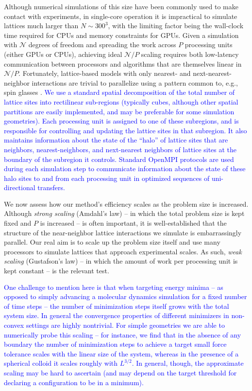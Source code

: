 \documentclass[utf8]{frontiersFPHY} %
\newcommand{\DMS}[1]{\textcolor{blue}{#1}}
\begin{document}
Although numerical simulations of this size have been commonly used to make contact with experiments, in single-core operation it is impractical to simulate lattices much larger than $N \sim 300^3$, with the limiting factor being the wall-clock time required for CPUs and memory constraints for GPUs. Given a simulation with $\mathcal{N}$ degrees of freedom and spreading the work across $P$ processing units (either GPUs or CPUs), achieving ideal $\mathcal{N}/P$ scaling requires both low-latency communication between processors and algorithms that are themselves linear in $\mathcal{N}/P$. Fortunately, lattice-based models with only nearest- and next-nearest-neighbor interactions are trivial to parallelize using a pattern common to, e.g., spin glasses \citep{lulli2015highly}. \DMS{We use a standard spatial decomposition of the total number of lattice sites into rectilinear sub-regions (typically cubes, although other spatial partitions are easily implemented, and may be preferable for some simulation geometries). Each processing unit is assigned to one of these subregions, and is responsible for controlling and updating the lattice sites in that subregion. It also maintains information about the state of the ``halo'' of lattice sites that are neighbors, nearest-neighbors, and next-nearest neighbors of lattice sites at the boundary of the subregion it controls. Standard OpenMPI protocols \citep{gabriel2004open} are used during each simulation step to communicate information about the state of these halo sites to and from each processing unit in optimized sequences of uni-directional transfers.}

We now assess how our method's efficiency scales as the problem size is increased. Although \emph{strong scaling} (Amdahl's law) -- in which the total problem size is kept fixed and $P$ is increased -- is often important, it is well-established that the structure of the near-neighbor lattice interactions we simulate is embarrassingly parallel. Our real aim is to scale up the problem size itself and use many processors to simulate lattices that approach experimental scales. As such, \emph{weak scaling} (Gustafson's law) -- in which the amount of work per processing unit is kept constant -- is the relevant test. 

\DMS{One challenge to mention here is that when targeting energy minima -- as opposed to simply advancing a molecular dynamics simulation for a fixed number of time steps -- the number of minimization steps itself grows with the total system size. In general the convergence properties of different minimizers in non-convex settings are highly nontrivial. For simple geometries we are able to numerically probe this scaling  -- for instance, we find that in the absence of any boundary the number of minimization steps to achieve a target small force tolerance scales with the linear size of the system, whereas in the presence of a spherical colloid it scales roughly with $L^{3/2}$. In general, though, the approximate scaling may be hard to ascertain (and may depend on the target threshold for declaring a configuration to be in a minimum).}
\end{document}
